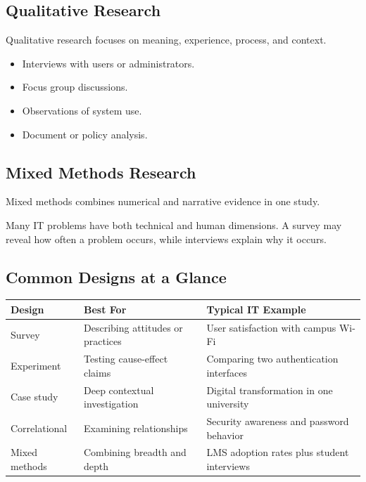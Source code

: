 \documentclass[11pt,a4paper]{article}
\begin{document}
\subsection{Qualitative Research}

Qualitative research focuses on meaning, experience, process, and context.

\begin{itemize}[leftmargin=*]
  \item Interviews with users or administrators.
  \item Focus group discussions.
  \item Observations of system use.
  \item Document or policy analysis.
\end{itemize}

\subsection{Mixed Methods Research}

Mixed methods combines numerical and narrative evidence in one study.

\begin{conceptbox}
Many IT problems have both technical and human dimensions. A survey may reveal how often a problem occurs, while interviews explain why it occurs.
\end{conceptbox}

\subsection{Common Designs at a Glance}

\begin{longtable}{L{2.8cm}L{3.1cm}L{5.5cm}}
\toprule
\textbf{Design} & \textbf{Best For} & \textbf{Typical IT Example} \\
\midrule
Survey & Describing attitudes or practices & User satisfaction with campus Wi-Fi \\
Experiment & Testing cause-effect claims & Comparing two authentication interfaces \\
Case study & Deep contextual investigation & Digital transformation in one university \\
Correlational & Examining relationships & Security awareness and password behavior \\
Mixed methods & Combining breadth and depth & LMS adoption rates plus student interviews \\
\bottomrule
\end{longtable}
\end{document}
